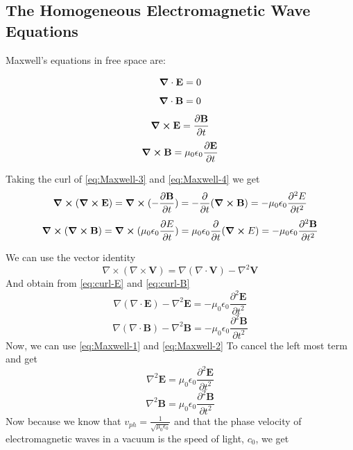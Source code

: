 \documentclass{article}
\numberwithin{equation}{section} %
\begin{document}
\subsection{The Homogeneous Electromagnetic Wave Equations}
Maxwell's equations in free space are:

\begin{equation}
    \label{eq:Maxwell-1}
    \grad \cdot \textbf{E} = 0
\end{equation}
\begin{equation}
    \label{eq:Maxwell-2}
    \grad \cdot \textbf{B} = 0
\end{equation}    
\begin{equation}
    \label{eq:Maxwell-3}
    \grad \cross \textbf{E} = \frac{\partial\textbf{B}}{\partial t}
\end{equation}
\begin{equation}
    \label{eq:Maxwell-4}
    \grad \cross \textbf{B} = \mu_0 \epsilon_0 \frac{\partial\textbf{E}}{\partial t}
\end{equation}

Taking the curl of \ref{eq:Maxwell-3} and \ref{eq:Maxwell-4} we get
\begin{equation}
    \label{eq:curl-E}
    \curl{(\curl{\textbf{E}})} = \curl{(-\frac{\partial \textbf{B}}{\partial t})} = -\frac{\partial}{\partial t}(\curl{\textbf{B}}) = - \mu_0 \epsilon_0 \frac{\partial^2 E}{\partial t^2}
\end{equation}
\begin{equation}
    \label{eq:curl-B}
    \curl{(\curl{\textbf{B}})} = \curl{(\mu_0 \epsilon_0 \frac{\partial E}{\partial t})} = \mu_0 \epsilon_0\frac{\partial}{\partial t}(\curl{E}) = - \mu_0 \epsilon_0 \frac{\partial^2 \textbf{B}}{\partial t^2}
\end{equation}
   
We can use the vector identity
\begin{equation}
    \nabla \times \left( \nabla \times \mathbf{V} \right) = \nabla \left( \nabla \cdot \mathbf{V} \right) - \nabla^2 \mathbf{V}
\end{equation}
And obtain from \ref{eq:curl-E} and \ref{eq:curl-B}
\begin{equation}
    \nabla(\nabla \cdot \textbf{E}) - \nabla^2 \textbf{E} = -\mu_0\epsilon_0\frac{\partial^2 \textbf{E}}{\partial t^2}
\end{equation}
\begin{equation}
    \nabla(\nabla \cdot \textbf{B}) - \nabla^2 \textbf{B} = -\mu_0\epsilon_0\frac{\partial^2 \textbf{B}}{\partial t^2}
\end{equation}
Now, we can use \ref{eq:Maxwell-1} and \ref{eq:Maxwell-2} To cancel the left most term and get
\begin{equation}
    \nabla^2 \textbf{E} = \mu_0\epsilon_0\frac{\partial^2 \textbf{E}}{\partial t^2}
\end{equation}
\begin{equation}
    \nabla^2 \textbf{B} = \mu_0\epsilon_0\frac{\partial^2 \textbf{B}}{\partial t^2}
\end{equation}
Now because we know that $v_{ph} = \frac{1}{\sqrt{\mu_0\epsilon_0}}$ and that the phase velocity of electromagnetic waves in a vacuum is the speed of light, $c_0$, we get
\end{document}
